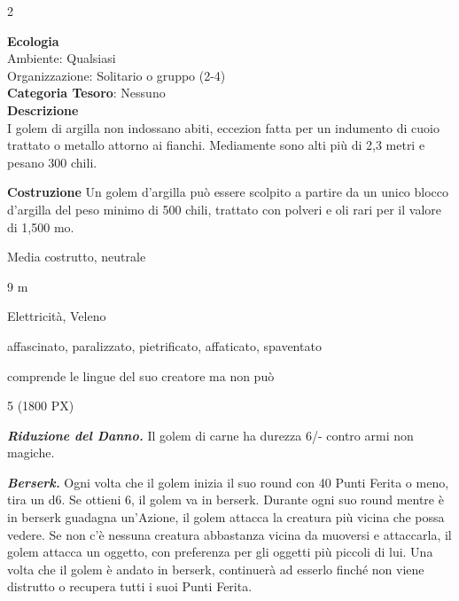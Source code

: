 \begin{multicols}{2}
{\textbf{Ecologia}\\
Ambiente: Qualsiasi\\
Organizzazione: Solitario o gruppo (2-4)\\
\textbf{Categoria Tesoro}: Nessuno\\
\textbf{Descrizione}\\
I golem di argilla non indossano abiti, eccezion fatta per un indumento di cuoio trattato o metallo attorno ai fianchi. Mediamente sono alti più di 2,3 metri e pesano 300 chili.

\textbf{Costruzione}
Un golem d'argilla può essere scolpito a partire da un unico blocco d'argilla del peso minimo di 500 chili, trattato con polveri e oli rari per il valore di 1,500 mo.

\begin{description}[noitemsep, topsep=0pt, parsep=0pt, partopsep=0pt, itemsep=1pt, leftmargin=2.35cm,  labelwidth=2.2cm, itemindent=0cm, listparindent=0pt] %
\setlength{\baselineskip}{10pt}
\item[\textbf{Taglia/Tipo}] Media costrutto, neutrale
\item[\textbf{Caratt.}] 
\item[\textbf{Punti Ferita}] 
\item[\textbf{Movimento}] 9 m
\item[\textbf{Tiri Salvez.}] 
\item[\textbf{Imm. Danni}] Elettricità, Veleno
\item[\textbf{Immunità}] affascinato, paralizzato, pietrificato, affaticato, spaventato
\item[\textbf{Sensi}] 
\item[\textbf{Linguaggi}] comprende le lingue del suo creatore ma non può
\item[\textbf{Sfida}] 5 (1800 PX)
\end{description}
\smallskip

\emph{\textbf{Riduzione del Danno.}} Il golem di carne ha durezza 6/- contro armi non magiche.

\emph{\textbf{Berserk.}} Ogni volta che il golem inizia il suo round con 40 Punti Ferita o meno, tira un d6. Se ottieni 6, il golem va in berserk. Durante ogni suo round mentre è in berserk guadagna un'Azione, il golem attacca la creatura più vicina che possa vedere. Se non c'è nessuna creatura abbastanza vicina da muoversi e attaccarla, il golem attacca un oggetto, con preferenza per gli oggetti più piccoli di lui. Una volta che il golem è andato in berserk, continuerà ad esserlo finché non viene distrutto o recupera tutti i suoi Punti Ferita.

}
\end{multicols}
